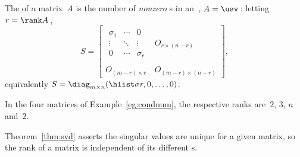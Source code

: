 \begin{definition} \label{def:rank}
    The  of a matrix~$A$ is the number of \emph{nonzero} s in an~\svd, \(A=\usv\)\,:
    letting \(r=\rank A\)\,,
\begin{equation*}
S=\begin{bmatrix} \begin{matrix} \sigma_1&\cdots&0\\
\vdots&\ddots&\vdots\\
0&\cdots&\sigma_r \end{matrix} & 
O_{r\times (n-r)}\\\,\\
O_{(m-r)\times r}&O_{(m-r)\times (n-r)}\end{bmatrix},
\end{equation*}
equivalently \(S=\diag_{m\times n}(\hlist\sigma r,0,\ldots,0)\).
\end{definition}

\begin{example} \label{eg:}
In the four matrices of Example~\ref{eg:condnum}, the respective ranks are~\(2\), \(3\), \(n\) and~\(2\).
\end{example}

Theorem~\ref{thm:svd} asserts the singular values are unique for a given matrix, so the rank of a matrix is independent of its different \svd{}s.


